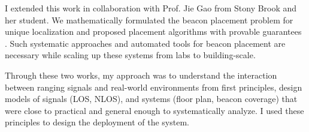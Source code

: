 \documentclass[10pt]{article}
\begin{document}

I extended this work in collaboration with
Prof. Jie Gao from Stony Brook and her student. We mathematically
formulated the beacon placement problem for unique localization and proposed placement
algorithms with provable guarantees \cite{beaconplacementtheory}. Such systematic approaches and automated tools for beacon
placement are necessary while scaling up these systems from labs to
building-scale. %

Through these two works, my approach was to understand the interaction between ranging signals and real-world environments from first principles, design models of signals (LOS, NLOS), and systems (floor plan, beacon coverage) that were close to practical and general enough to systematically analyze. I used these principles to design the deployment of the system. 



\end{document}
